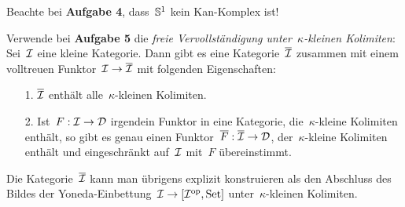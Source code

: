 \documentclass{uebblatt}
\begin{document}
Beachte bei \textbf{Aufgabe 4}, dass~$\mathbb{S}^1$ kein Kan-Komplex ist!

Verwende bei \textbf{Aufgabe 5} die \emph{freie Vervollständigung
unter~$\kappa$-kleinen Kolimiten}: Sei~$\mathcal{I}$ eine kleine Kategorie. Dann gibt es
eine Kategorie~$\overline{\mathcal{I}}$ zusammen mit einem volltreuen Funktor~$\mathcal{I} \to
\overline{\mathcal{I}}$ mit folgenden Eigenschaften:
\begin{enumerate}
\item[1.] $\overline{\mathcal{I}}$ enthält alle~$\kappa$-kleinen Kolimiten.
\item[2.] Ist~$F : \mathcal{I} \to \mathcal{D}$ irgendein Funktor in eine Kategorie,
die~$\kappa$-kleine Kolimiten enthält, so gibt es genau einen
Funktor~$\overline{F} : \overline{\mathcal{I}} \to \mathcal{D}$, der~$\kappa$-kleine Kolimiten
enthält und eingeschränkt auf~$\mathcal{I}$ mit~$F$ übereinstimmt.
\end{enumerate}
Die Kategorie~$\overline{\mathcal{I}}$ kann man übrigens explizit konstruieren als den
Abschluss des Bildes der Yoneda-Einbettung~$\mathcal{I} \to [\mathcal{I}^{\mathrm{op}},\mathrm{Set}]$
unter~$\kappa$-kleinen Kolimiten.
\end{document}
